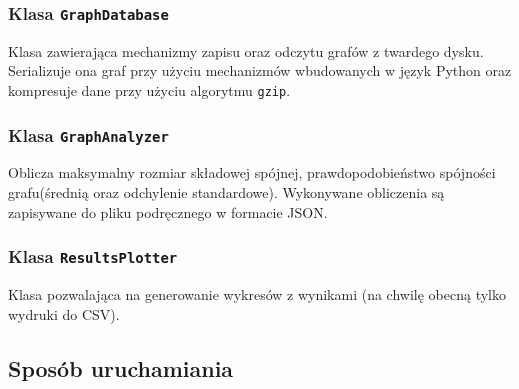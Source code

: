 		\subsubsection{Klasa \texttt{GraphDatabase}}

			Klasa zawierająca mechanizmy zapisu oraz odczytu grafów z twardego dysku. Serializuje ona graf przy użyciu mechanizmów wbudowanych w język Python oraz kompresuje dane przy użyciu algorytmu \texttt{gzip}.

		\subsubsection{Klasa \texttt{GraphAnalyzer}}

			Oblicza maksymalny rozmiar składowej spójnej, prawdopodobieństwo spójności grafu(średnią oraz odchylenie standardowe). Wykonywane obliczenia są zapisywane do pliku podręcznego w formacie JSON.

		\subsubsection{Klasa \texttt{ResultsPlotter}}

			Klasa pozwalająca na generowanie wykresów z wynikami (na chwilę obecną tylko wydruki do CSV).

	\subsection{Sposób uruchamiania}
		\label{final:struktura:uruchamianie}

